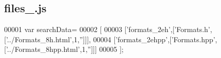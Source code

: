 \subsection{files\+\_.\+js}
\label{files__3_8js_source}

\begin{DoxyCode}
00001 var searchData=
00002 [
00003   [\textcolor{stringliteral}{'formats\_2eh'},[\textcolor{stringliteral}{'Formats.h'},[\textcolor{stringliteral}{'../Formats\_8h.html'},1,\textcolor{stringliteral}{''}]]],
00004   [\textcolor{stringliteral}{'formats\_2ehpp'},[\textcolor{stringliteral}{'Formats.hpp'},[\textcolor{stringliteral}{'../Formats\_8hpp.html'},1,\textcolor{stringliteral}{''}]]]
00005 ];
\end{DoxyCode}

